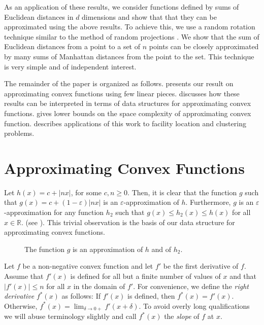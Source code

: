 \documentclass[charterfonts,lotsofwhite]{patmorin}
\newcommand{\eps}{\varepsilon}
\newcommand{\Real}{\mathbb{R}}
\begin{document}
As an application of these results, we consider functions defined by
sums of Euclidean distances in $d$ dimensions and show that that they
can be approximated using the above results.  To achieve this, we use
a random rotation technique similar to the method of random
projections \cite{i01}.  We show that the sum of Euclidean distances
from a point to a set of $n$ points can be closely approximated by
many sums of Manhattan distances from the point to the set.  This
technique is very simple and of independent interest.

The remainder of the paper is organized as follows.  
presents our result on approximating convex functions using few linear
pieces.   discusses how these results can be interpreted in
terms of data structures for approximating convex functions.
 gives lower bounds on the space complexity of
approximating convex function.   describes
applications of this work to facility location and clustering
problems.

\section{Approximating Convex Functions}

Let $h(x)=c+|nx|$, for some $c,n\ge 0$.  Then, it is clear that the
function $g$ such that $g(x)=c+(1-\eps)|nx|$ is an
$\eps$-approximation of $h$.  Furthermore, $g$ is an
$\eps$-approximation for any function $h_2$ such that $g(x)\le
h_2(x)\le h(x)$ for all $x\in\Real$. (see ).  This
trivial observation is the basis of our data structure for
approximating convex functions.

\begin{figure}
\caption{The function $g$ is an approximation of $h$ and
of $h_2$.}
\end{figure}

Let $f$ be a non-negative convex function and let $f'$ be the first
derivative of $f$.  Assume that $f'(x)$ is defined for all but a
finite number of values of $x$ and that $|f'(x)|\le n$ for all $x$ in
the domain of $f'$.  For convenience, we define the \emph{right
derivative} $f^*(x)$ as follows: If $f'(x)$ is defined, then
$f^*(x)=f'(x)$.  Otherwise, $f^*(x)=\lim_{\delta\rightarrow 0+}
f'(x+\delta)$.  To avoid overly long qualifications we will abuse
terminology slightly and call $f^*(x)$ the \emph{slope} of $f$ at $x$.
\end{document}

